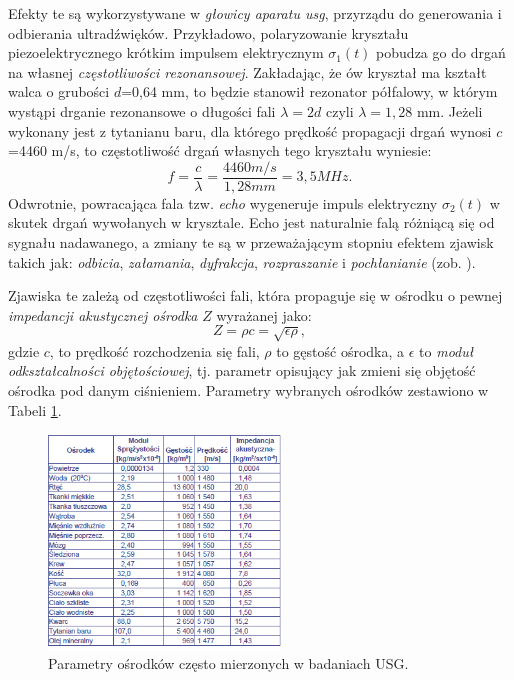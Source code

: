 Efekty te są wykorzystywane w \textit{głowicy aparatu usg}, przyrządu do generowania i odbierania ultradźwięków. Przykładowo, polaryzowanie kryształu piezoelektrycznego krótkim impulsem elektrycznym $\sigma_1(t)$ pobudza go do drgań na własnej \textit{częstotliwości rezonansowej}. Zakładając, że ów kryształ ma kształt walca o grubości $d$=0,64 mm, to będzie stanowił rezonator półfalowy, w którym wystąpi drganie rezonansowe o długości fali $\lambda = 2d$ czyli $\lambda = 1,28$ mm. Jeżeli wykonany jest z tytanianu baru, dla którego prędkość propagacji drgań wynosi $c$=4460 m/s, to częstotliwość drgań własnych tego kryształu wyniesie:
\begin{equation}
f = \frac{c}{\lambda} = \frac{4460 m/s}{1,28 mm} = 3,5 MHz.
\end{equation}
Odwrotnie, powracająca fala tzw. \textit{echo} wygeneruje impuls elektryczny $\sigma_2(t)$ w skutek drgań wywołanych w krysztale. Echo jest naturalnie falą różniącą się od sygnału nadawanego, a zmiany te są w przeważającym stopniu efektem zjawisk takich jak: \textit{odbicia}, \textit{załamania}, \textit{dyfrakcja}, \textit{rozpraszanie} i \textit{pochłanianie} (zob. \cite{makarewicz1978}).

Zjawiska te zależą od częstotliwości fali, która propaguje się w ośrodku o pewnej \textit{impedancji akustycznej ośrodka} $Z$ wyrażanej jako:
\begin{equation}
Z = \rho c = \sqrt{\epsilon \rho},
\end{equation}
gdzie $c$, to prędkość rozchodzenia się fali, $\rho$ to gęstość ośrodka, a $\epsilon$ to \textit{moduł odkształcalności objętościowej}, tj. parametr opisujący jak zmieni się objętość ośrodka pod danym ciśnieniem. Parametry wybranych ośrodków zestawiono w Tabeli \ref{USG-params}. 
\begin{figure}[h!]
	\centering
	\includegraphics[width=0.55\textwidth]{figures/USG-params.png}
	\caption{Parametry ośrodków często mierzonych w badaniach USG.}
	\label{USG-params}
\end{figure}

